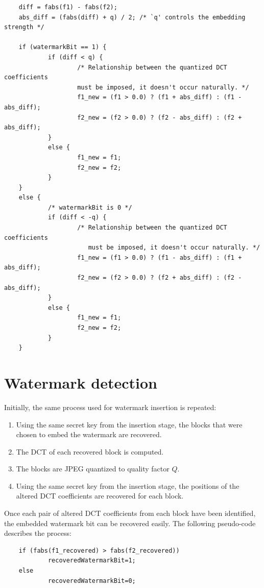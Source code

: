 \documentclass[12pt]{report}
\renewcommand{\baselinestretch}{1.5}
\begin{document}
	\footnotesize
	\renewcommand{\baselinestretch}{1}
	\begin{verbatim}
	diff = fabs(f1) - fabs(f2);
	abs_diff = (fabs(diff) + q) / 2; /* `q' controls the embedding strength */
                                  		 
	if (watermarkBit == 1) {
	        if (diff < q) {
	                /* Relationship between the quantized DCT coefficients
	                must be imposed, it doesn't occur naturally. */
	                f1_new = (f1 > 0.0) ? (f1 + abs_diff) : (f1 - abs_diff);
	                f2_new = (f2 > 0.0) ? (f2 - abs_diff) : (f2 + abs_diff);
	        }
	        else {
	                f1_new = f1;
	                f2_new = f2;
	        }
	}
	else {         
	        /* watermarkBit is 0 */
	        if (diff < -q) {
	                /* Relationship between the quantized DCT coefficients
        	           must be imposed, it doesn't occur naturally. */
	                f1_new = (f1 > 0.0) ? (f1 - abs_diff) : (f1 + abs_diff);
	                f2_new = (f2 > 0.0) ? (f2 + abs_diff) : (f2 - abs_diff);
	        }
	        else {
	                f1_new = f1;
	                f2_new = f2;
	        }
	}	
	\end{verbatim}
	\renewcommand{\baselinestretch}{1.5}
	\normalsize
	
\section{Watermark detection}	
	Initially, the same process used for watermark insertion is repeated:
	\begin{enumerate}
		\item Using the same secret key from the insertion stage, the blocks that were chosen to embed the 
		watermark are recovered.
		\item The DCT of each recovered block is computed.
		\item The blocks are JPEG quantized to quality factor $Q$.
		\item Using the same secret key from the insertion stage, the positions of the 
		altered DCT coefficients are recovered for each block.
	\end{enumerate}
	Once each pair of altered DCT coefficients from each block have been identified, 
	the embedded watermark bit can be recovered easily. The following pseudo-code
	describes the process:

	\footnotesize
	\renewcommand{\baselinestretch}{1}
	\begin{verbatim}
	if (fabs(f1_recovered) > fabs(f2_recovered))
	        recoveredWatermarkBit=1;
	else
	        recoveredWatermarkBit=0;		
	\end{verbatim}
	\renewcommand{\baselinestretch}{1.5}
	\normalsize
			
\end{document}
